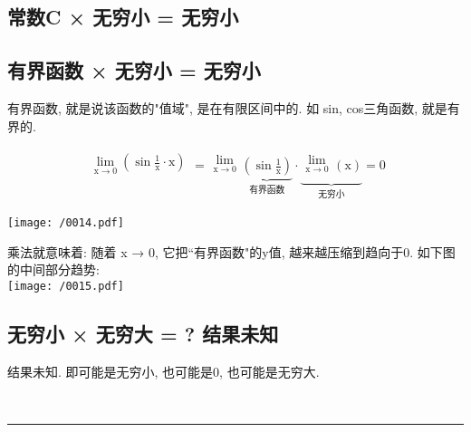 \documentclass[UTF8]{ctexart}
\begin{document}
\subsection{常数C × 无穷小 = 无穷小 } 

\subsection{有界函数 × 无穷小 = 无穷小 } 

有界函数, 就是说该函数的"值域", 是在有限区间中的. 如 sin, cos三角函数, 就是有界的.

\begin{tcolorbox}[title = {例},boxrule={0.1em},colframe={black!10}, colback={black!3},colbacktitle={black!10},coltitle={black}]
	\begin{align*}  %
		\begin{matrix}
			\lim_{\text{x}\rightarrow 0}\left( \sin \frac{1}{\text{x}}\cdot \text{x} \right)\\
		\end{matrix}=\begin{matrix}
			\lim_{\text{x}\rightarrow 0}\\
		\end{matrix}\underset{\text{有界函数}}{\underbrace{\left( \sin \frac{1}{\text{x}} \right) }}\cdot \underset{\text{无穷小}}{\underbrace{\begin{matrix}
					\lim_{\text{x}\rightarrow 0}\\
				\end{matrix}\left( \text{x} \right) }}=0 
	\end{align*}
	
	\texttt{[image: /0014.pdf]}
	
	乘法就意味着: 随着 x → 0, 它把``有界函数"的y值, 越来越压缩到趋向于0. 如下图的中间部分趋势: \\
	
	\texttt{[image: /0015.pdf]}
\end{tcolorbox}


\subsection{无穷小 × 无穷大 = ?  结果未知} 

结果未知. 即可能是无穷小, 也可能是0, 也可能是无穷大.



~\\
\hrule
~\\
\end{document}
